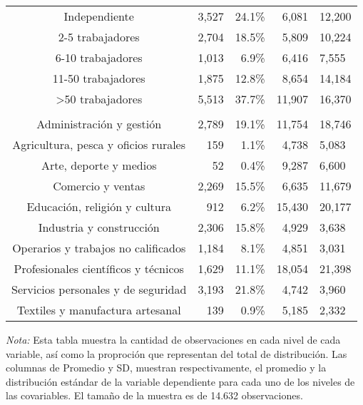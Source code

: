 \begin{longtable}{crrrl}
\midrule\addlinespace[2.5pt]
\multicolumn{5}{l}{{\bfseries Cantidad de trabajadores
de la empresa en que trabaja}} \\[2.5pt] 
\midrule\addlinespace[2.5pt]
Independiente & 3,527 & 24.1\% &  6,081 & 12,200 \\ 
2-5 trabajadores & 2,704 & 18.5\% &  5,809 & 10,224 \\ 
6-10 trabajadores & 1,013 &  6.9\% &  6,416 &  7,555 \\ 
11-50 trabajadores & 1,875 & 12.8\% &  8,654 & 14,184 \\ 
>50 trabajadores & 5,513 & 37.7\% & 11,907 & 16,370 \\ 
\midrule\addlinespace[2.5pt]
\multicolumn{5}{l}{{\bfseries Oficio}} \\[2.5pt] 
\midrule\addlinespace[2.5pt]
Administración y gestión & 2,789 & 19.1\% & 11,754 & 18,746 \\ 
Agricultura, pesca y oficios rurales &   159 &  1.1\% &  4,738 &  5,083 \\ 
Arte, deporte y medios &    52 &  0.4\% &  9,287 &  6,600 \\ 
Comercio y ventas & 2,269 & 15.5\% &  6,635 & 11,679 \\ 
Educación, religión y cultura &   912 &  6.2\% & 15,430 & 20,177 \\ 
Industria y construcción & 2,306 & 15.8\% &  4,929 &  3,638 \\ 
Operarios y trabajos no calificados & 1,184 &  8.1\% &  4,851 &  3,031 \\ 
Profesionales científicos y técnicos & 1,629 & 11.1\% & 18,054 & 21,398 \\ 
Servicios personales y de seguridad & 3,193 & 21.8\% &  4,742 &  3,960 \\ 
Textiles y manufactura artesanal &   139 &  0.9\% &  5,185 &  2,332 \\ 
\bottomrule
\end{longtable}
\endgroup
\begin{minipage}{0.8\textwidth}
                                   \begin{tablenotes}
                                   \item \footnotesize \textit{Nota:} Esta tabla muestra la cantidad de observaciones en cada nivel de cada variable, 
                                   así como la proproción que representan del total de distribución.
                                   Las columnas de Promedio y SD, muestran respectivamente, el promedio y la distribución estándar
                                   de la variable dependiente para cada uno de los niveles de las covariables. 
                                   El tamaño de la muestra es de 14.632 observaciones.
                                   \end{tablenotes}
                                   \end{minipage}
